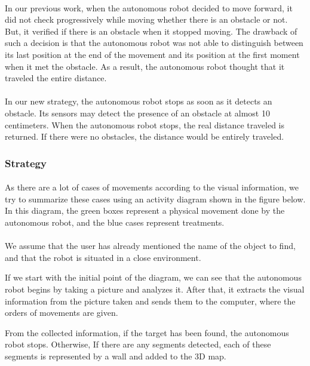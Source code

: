 \documentclass[12pt]{report}
\begin{document}
\paragraph{}
In our previous work, when the autonomous robot decided to move forward, it did not check progressively while moving whether there is an obstacle or not. But, it verified if there is an obstacle when it stopped moving. The drawback of such a decision is that the autonomous robot was not able to distinguish between its last position at the end of the movement and its position at the first moment when it met the obstacle. As a result, the autonomous robot thought that it traveled the entire distance.

\paragraph{}
In our new strategy, the autonomous robot stops as soon as it detects an obstacle. Its sensors may detect the presence of an obstacle at almost 10 centimeters. When the autonomous robot stops, the real distance traveled is returned. If there were no obstacles, the distance would be entirely traveled.
\subsubsection{Strategy}
\paragraph{}
As there are a lot of cases of movements according to the visual information, we try to summarize these cases using an activity diagram shown in the figure below. In this diagram, the green boxes represent a physical movement done by the autonomous robot, and the blue cases represent treatments. 

\paragraph{}
We assume that the user has already mentioned the name of the object to find, and that the robot is situated in a close environment.

If we start with the initial point of the diagram, we can see that the autonomous robot begins by taking a picture and analyzes it. After that, it extracts the visual information from the picture taken and sends them to the computer, where the orders of movements are given. 

From the collected information, if the target has been found, the autonomous robot stops. Otherwise, If there are any segments detected, each of these segments is represented by a wall and added to the 3D map.
\end{document}

